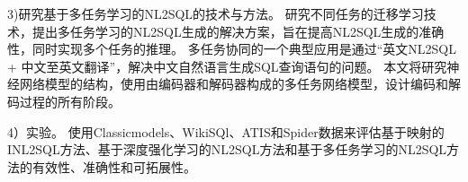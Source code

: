 3)研究基于多任务学习的NL2SQL的技术与方法。
研究不同任务的迁移学习技术，提出多任务学习的NL2SQL生成的解决方案，旨在提高NL2SQL生成的准确性，同时实现多个任务的推理。
多任务协同的一个典型应用是通过“英文NL2SQL + 中文至英文翻译”，解决中文自然语言生成SQL查询语句的问题。
本文将研究神经网络模型的结构，使用由编码器和解码器构成的多任务网络模型，设计编码和解码过程的所有阶段。

4）实验。
使用Classicmodels、WikiSQl、ATIS和Spider数据来评估基于映射的INL2SQL方法、基于深度强化学习的NL2SQL方法和基于多任务学习的NL2SQL方法的有效性、准确性和可拓展性。


